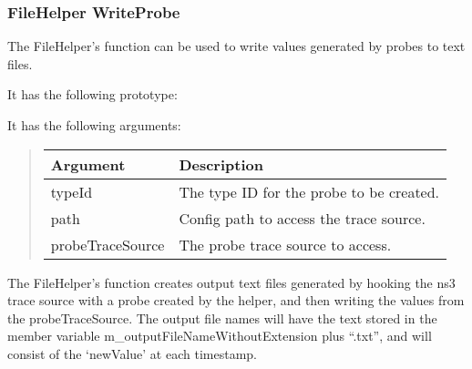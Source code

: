 \documentclass[letterpaper,10pt,english]{sphinxmanual}
\renewcommand{\sphinxcode}[1]{\texttt{\small{#1}}}
\begin{document}
\subsubsection{FileHelper WriteProbe}
\label{\detokenize{data-collection-helpers:filehelper-writeprobe}}
The FileHelper’s \sphinxcode{} function can be used
to write values generated by probes to text files.

It has the following prototype:

\begin{sphinxVerbatim}[commandchars=\\\{\}]
    
                   
                   
\end{sphinxVerbatim}

It has the following arguments:
\begin{quote}


\begin{savenotes}\sphinxattablestart
\centering
\begin{tabulary}{\linewidth}[t]{|T|T|}
\hline
\sphinxstyletheadfamily 
Argument
&\sphinxstyletheadfamily 
Description
\\
\hline
typeId
&
The type ID for the probe
to be created.
\\
\hline
path
&
Config path to access the
trace source.
\\
\hline
probeTraceSource
&
The probe trace source to
access.
\\
\hline
\end{tabulary}
\par
\sphinxattableend\end{savenotes}
\end{quote}

The FileHelper’s \sphinxcode{} function
creates output text files generated by hooking the ns\sphinxhyphen{}3 trace source
with a probe created by the helper, and then writing the values from the
probeTraceSource. The output file names will have the text stored
in the member variable  m\_outputFileNameWithoutExtension plus “.txt”,
and will consist of the ‘newValue’ at each timestamp.
\end{document}
